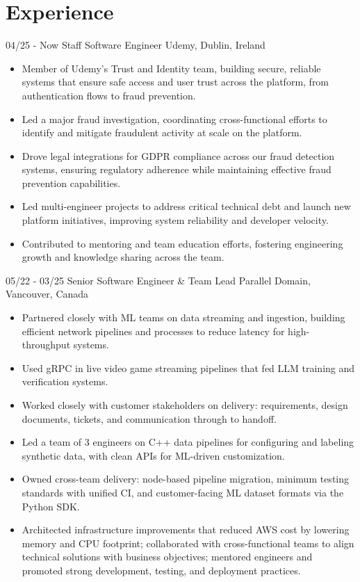 \documentclass[]{cv-style}
\begin{document}
\section{Experience}
\begin{entrylist}
\entry
    {04/25 - Now}
    {Staff Software Engineer}
    {Udemy, Dublin, Ireland}
    {
    \begin{itemize}
    \item Member of Udemy's Trust and Identity team, building secure, reliable systems that ensure safe access and user trust across the platform, from authentication flows to fraud prevention.
    \item Led a major fraud investigation, coordinating cross-functional efforts to identify and mitigate fraudulent activity at scale on the platform.
    \item Drove legal integrations for GDPR compliance across our fraud detection systems, ensuring regulatory adherence while maintaining effective fraud prevention capabilities.
    \item Led multi-engineer projects to address critical technical debt and launch new platform initiatives, improving system reliability and developer velocity.
    \item Contributed to mentoring and team education efforts, fostering engineering growth and knowledge sharing across the team.
    \end{itemize}
    }

\entry
    {05/22 - 03/25}
    {Senior Software Engineer \& Team Lead}
    {Parallel Domain, Vancouver, Canada}
    {
    \begin{itemize}
    \item Partnered closely with ML teams on data streaming and ingestion, building efficient network pipelines and processes to reduce latency for high-throughput systems.
    \item Used gRPC in live video game streaming pipelines that fed LLM training and verification systems.
    \item Worked closely with customer stakeholders on delivery: requirements, design documents, tickets, and communication through to handoff.
    \item Led a team of 3 engineers on C++ data pipelines for configuring and labeling synthetic data, with clean APIs for ML-driven customization.
    \item Owned cross-team delivery: node-based pipeline migration, minimum testing standards with unified CI, and customer-facing ML dataset formats via the Python SDK.
    \item Architected infrastructure improvements that reduced AWS cost by lowering memory and CPU footprint; collaborated with cross-functional teams to align technical solutions with business objectives; mentored engineers and promoted strong development, testing, and deployment practices.
    \end{itemize}
    }


\end{entrylist}
\end{document}
